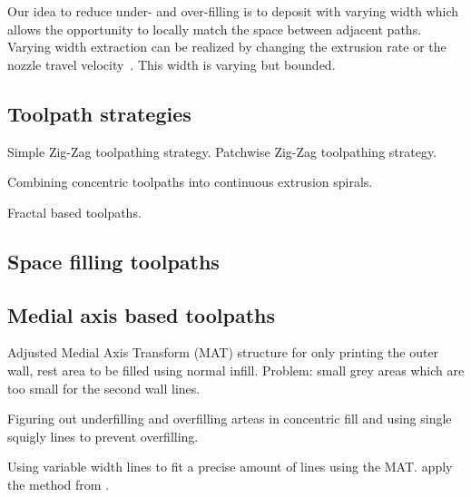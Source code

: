 Our idea to reduce under- and over-filling is to deposit with varying width which allows the opportunity to locally match the space between adjacent paths. Varying width extraction can be realized by changing the extrusion rate or the nozzle travel velocity~\cite{Ertay2018,Kuipers2018}. This width is varying but bounded.




\subsection{Toolpath strategies}
Simple Zig-Zag toolpathing strategy. \cite{mcmains2000layered}
Patchwise Zig-Zag toolpathing strategy. \cite{Ding2014}

Combining concentric toolpaths into continuous extrusion spirals. \cite{Held2009}

Fractal based toolpaths. \cite{Griffiths1994, mandal2016}

\subsection{Space filling toolpaths}


\subsection{Medial axis based toolpaths}
Adjusted Medial Axis Transform (MAT) structure for only printing the outer wall, rest area to be filled using normal infill. \cite{Moesen2011}
Problem: small grey areas which are too small for the second wall lines.

Figuring out underfilling and overfilling arteas in concentric fill and using single squigly lines to prevent overfilling. \cite{Jin2017}

Using variable width lines to fit a precise amount of lines using the MAT.
\cite{Ding2016a} apply the method from \cite{kao1998optimal}.

